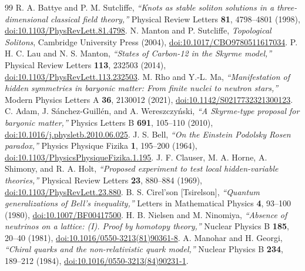 \documentclass[10pt,aps,prd,twocolumn,superscriptaddress,nofootinbib,floatfix,longbibliography,showkeys]{revtex4-2}
\begin{document}
\begin{thebibliography}{99}
 R. A. Battye and P. M. Sutcliffe, \textit{``Knots as stable soliton solutions in a three-dimensional classical field theory,''} Physical Review Letters \textbf{81}, 4798--4801 (1998), \href{https://doi.org/10.1103/PhysRevLett.81.4798}{doi:10.1103/PhysRevLett.81.4798}.
 N. Manton and P. Sutcliffe, \textit{Topological Solitons}, Cambridge University Press (2004), \href{https://doi.org/10.1017/CBO9780511617034}{doi:10.1017/CBO9780511617034}.
 P. H. C. Lau and N. S. Manton, \textit{``States of Carbon-12 in the Skyrme model,''} Physical Review Letters \textbf{113}, 232503 (2014), \href{https://doi.org/10.1103/PhysRevLett.113.232503}{doi:10.1103/PhysRevLett.113.232503}.
 M. Rho and Y.-L. Ma, \textit{``Manifestation of hidden symmetries in baryonic matter: From finite nuclei to neutron stars,''} Modern Physics Letters A \textbf{36}, 2130012 (2021), \href{https://doi.org/10.1142/S0217732321300123}{doi:10.1142/S0217732321300123}.
 C. Adam, J. S\'anchez-Guill\'en, and A. Wereszczy\'nski, \textit{``A Skyrme-type proposal for baryonic matter,''} Physics Letters B \textbf{691}, 105--110 (2010), \href{https://doi.org/10.1016/j.physletb.2010.06.025}{doi:10.1016/j.physletb.2010.06.025}.
 J. S. Bell, \textit{``On the Einstein Podolsky Rosen paradox,''} Physics Physique Fizika \textbf{1}, 195--200 (1964), \href{https://doi.org/10.1103/PhysicsPhysiqueFizika.1.195}{doi:10.1103/PhysicsPhysiqueFizika.1.195}.
 J. F. Clauser, M. A. Horne, A. Shimony, and R. A. Holt, \textit{``Proposed experiment to test local hidden-variable theories,''} Physical Review Letters \textbf{23}, 880--884 (1969), \href{https://doi.org/10.1103/PhysRevLett.23.880}{doi:10.1103/PhysRevLett.23.880}.
 B. S. Cirel'son [Tsirelson], \textit{``Quantum generalizations of Bell's inequality,''} Letters in Mathematical Physics \textbf{4}, 93--100 (1980), \href{https://doi.org/10.1007/BF00417500}{doi:10.1007/BF00417500}.
 H. B. Nielsen and M. Ninomiya, \textit{``Absence of neutrinos on a lattice: (I). Proof by homotopy theory,''} Nuclear Physics B \textbf{185}, 20--40 (1981), \href{https://doi.org/10.1016/0550-3213(81)90361-8}{doi:10.1016/0550-3213(81)90361-8}.
 A. Manohar and H. Georgi, \textit{``Chiral quarks and the non-relativistic quark model,''} Nuclear Physics B \textbf{234}, 189--212 (1984), \href{https://doi.org/10.1016/0550-3213(84)90231-1}{doi:10.1016/0550-3213(84)90231-1}.
\end{thebibliography}
\end{document}
